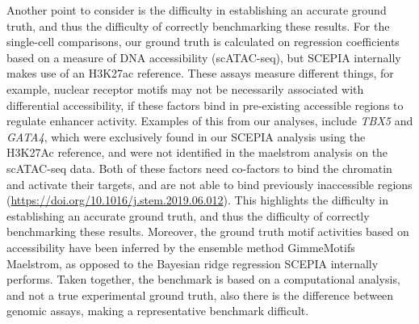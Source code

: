 Another point to consider is the difficulty in establishing an accurate ground truth, and thus the difficulty of correctly benchmarking these results. For the single-cell comparisons, our ground truth is calculated on regression coefficients based on a measure of DNA accessibility (scATAC-seq), but SCEPIA internally makes use of an H3K27ac reference. These assays measure different things, for example, nuclear receptor motifs may not be necessarily associated with differential accessibility, if these factors bind in pre-existing accessible regions to regulate enhancer activity. Examples of this from our analyses, include \textit{TBX5} and \textit{GATA4}, which were exclusively found in our SCEPIA analysis using the H3K27Ac reference, and were not identified in the maelstrom analysis on the scATAC-seq data. Both of these factors need co-factors to bind the chromatin and activate their targets, and are not able to bind previously inaccessible regions (\href{https://doi.org/10.1016/j.stem.2019.06.012}{https://doi.org/10.1016/j.stem.2019.06.012}). This highlights the difficulty in establishing an accurate ground truth, and thus the difficulty of correctly benchmarking these results. Moreover, the ground truth motif activities based on accessibility have been inferred by the ensemble method GimmeMotifs Maelstrom, as opposed to the Bayesian ridge regression SCEPIA internally performs. Taken together, the benchmark is based on a computational analysis, and not a true experimental ground truth, also there is the difference between genomic assays, making a representative benchmark difficult. 

